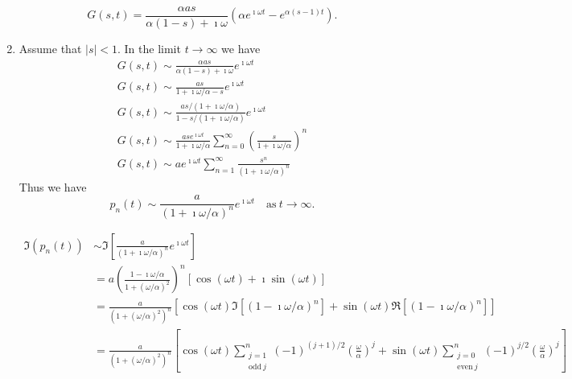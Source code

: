 \begin{Solution}
\begin{enumerate}
    \[ \boxed{G(s,t)=\frac{\alpha a s}{\alpha(1-s) + \imath \omega} 
      \left(\alpha e^{\imath \omega t} - e^{\alpha(s-1) t} \right).} \]
  \item
    Assume that $|s| < 1$. In the limit $t \to \infty$ we have
    \begin{gather*}
      G(s,t) \sim \frac{\alpha a s}{\alpha(1-s) + \imath \omega} e^{\imath \omega t} \\
      G(s,t) \sim \frac{a s}{1 + \imath \omega/\alpha - s} e^{\imath \omega t} \\
      G(s,t) \sim \frac{a s/(1+ \imath \omega/\alpha)}{1 - s/(1 + \imath \omega/\alpha)} 
      e^{\imath \omega t} \\
      G(s,t) \sim \frac{a s e^{\imath \omega t}}{1+ \imath \omega/\alpha} 
      \sum_{n = 0}^\infty \left(\frac{s} {1+\imath \omega/\alpha} \right)^n \\
      G(s,t) \sim a e^{\imath \omega t} \sum_{n = 1}^\infty \frac{s^n}
      {(1 + \imath \omega/\alpha)^n}  
    \end{gather*}
    Thus we have 
    \[ 
    \boxed{p_n(t) \sim \frac{a}{(1 + \imath \omega/\alpha)^n} e^{\imath \omega t} \quad
      \mathrm{as}\ t \to \infty.} 
    \]


    \begin{align*}
      \Im(p_n(t))
      &\sim \Im \left[\frac{a}{(1 + \imath \omega/\alpha)^n} e^{\imath \omega t}
      \right] \\
      &= a \left(\frac{1 - \imath \omega/\alpha}{1 + (\omega/\alpha)^2} 
      \right)^n [ \cos(\omega t) + \imath \sin(\omega t) ] \\
      &= \frac{a}{(1+(\omega/\alpha)^2)^n} \left[ \cos(\omega t)
        \Im[(1 - \imath \omega/\alpha)^n] + \sin(\omega t)
        \Re[(1 - \imath \omega/\alpha)^n] \right] \\
      &= \frac{a}{(1+(\omega/\alpha)^2)^n} \left[ \cos(\omega t)
        \sum_{\substack{j = 1 \\ \mathrm{odd}\ j}}^n
        (-1)^{(j+1)/2} \left(\frac{\omega}{\alpha}\right)^j 
        + \sin(\omega t) 
        \sum_{ \substack{j = 0 \\ \mathrm{even}\ j}}^n
        (-1)^{j/2} \left(\frac{\omega}{\alpha}\right)^j \right] 
    \end{align*}
  \end{enumerate}
\end{Solution}



